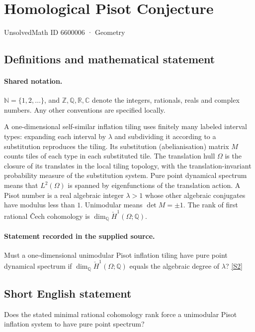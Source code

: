 \documentclass[11pt]{article}
\newcommand{\sref}[2]{\hyperlink{source:#1:#2}{[S#2]}}
\begin{document}
\setcounter{section}{6600005}
\section{Homological Pisot Conjecture}\label{6600006}
{\small\sffamily UnsolvedMath ID 6600006 · Geometry}
\subsection{Definitions and mathematical statement}

\paragraph{Shared notation.}$\mathbb N=\{1,2,\ldots\}$, and $\mathbb Z,\mathbb Q,\mathbb R,\mathbb C$ denote the integers, rationals, reals and complex numbers. Any other conventions are specified locally.


A one-dimensional self-similar inflation tiling uses finitely many labeled interval types: expanding each interval by $\lambda$ and subdividing it according to a substitution reproduces the tiling. Its substitution (abelianisation) matrix $M$ counts tiles of each type in each substituted tile. The translation hull $\Omega$ is the closure of its translates in the local tiling topology, with the translation-invariant probability measure of the substitution system. Pure point dynamical spectrum means that $L^2(\Omega)$ is spanned by eigenfunctions of the translation action. A Pisot number is a real algebraic integer $\lambda>1$ whose other algebraic conjugates have modulus less than $1$. Unimodular means $\det M=\pm1$. The rank of first rational Čech cohomology is $\dim_{\mathbb Q}\check H^1(\Omega;\mathbb Q)$.
\paragraph{Statement recorded in the supplied source.}
Must a one-dimensional unimodular Pisot inflation tiling have pure point dynamical spectrum if $\dim_{\mathbb Q}\check H^1(\Omega;\mathbb Q)$ equals the algebraic degree of $\lambda$? \sref{6600006}{2}
\subsection{Short English statement}
Does the stated minimal rational cohomology rank force a unimodular Pisot inflation system to have pure point spectrum?
\end{document}

